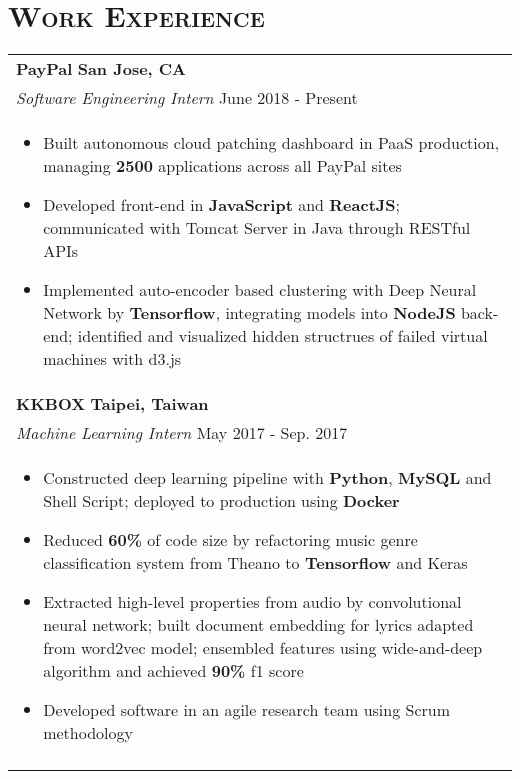 \documentclass[letterpaper,11pt]{article} %
\begin{document}
{\section{\Large\bf\textsc{Work Experience}}
\begin{tabular}{p{18.5cm}}

{\bf{PayPal}} \hfill \bf{San Jose, CA}\\
{\it Software Engineering Intern} \hfill June 2018 - Present\\%
\begin{itemize}
\vspace{-3mm}
\item Built autonomous cloud patching dashboard in PaaS production, managing {\bf 2500} applications across all PayPal sites 
\item Developed front-end in {\bf JavaScript} and {\bf ReactJS}; communicated with Tomcat Server in Java through RESTful APIs
\item Implemented auto-encoder based clustering with Deep Neural Network by {\bf Tensorflow}, integrating models into {\bf NodeJS} back-end; identified and visualized hidden structrues of failed virtual machines with d3.js 
\vspace*{-\baselineskip} 
\end{itemize} \\ 
\vspace{.1mm}

{\bf{KKBOX}} \hfill \bf{Taipei, Taiwan}\\
{\it Machine Learning Intern} \hfill  May 2017 - Sep. 2017\\%
\begin{itemize}
\vspace{-3mm}
\item Constructed deep learning pipeline with {\bf Python}, {\bf MySQL} and Shell Script; deployed to production using {\bf Docker}
\item Reduced {\bf 60\%} of code size by refactoring music genre classification system from Theano to {\bf Tensorflow} and Keras 
\item Extracted high-level properties from audio by convolutional neural network; built document embedding for lyrics adapted from word2vec model; ensembled features using wide-and-deep algorithm and achieved {\bf 90\%} f1 score 
\item Developed software in an agile research team using Scrum methodology \vspace*{-\baselineskip}
\end{itemize} \\ 
\vspace{.1mm}


\end{tabular}}
\end{document}
